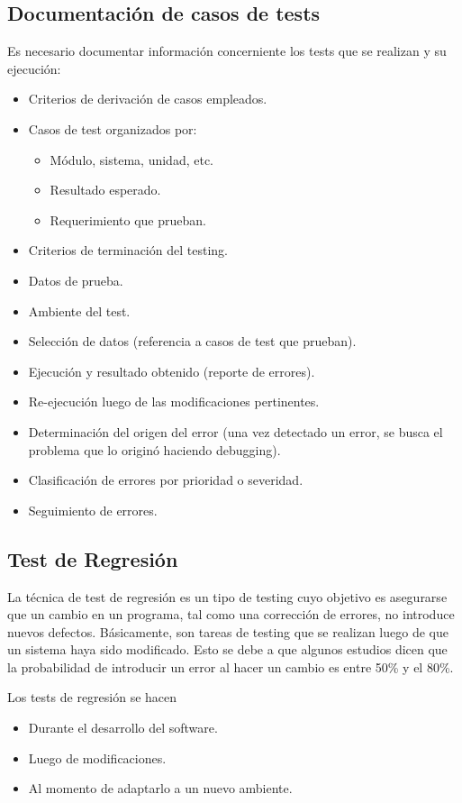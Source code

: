 \documentclass[]{article}
\begin{document}
\subsection{Documentación de casos de tests}
Es necesario documentar información concerniente los tests que se realizan y su ejecución:
\begin{itemize}
	\item Criterios de derivación de casos empleados.
	\item Casos de test organizados por:
	\begin{itemize}
		\item Módulo, sistema, unidad, etc.
		\item Resultado esperado.
		\item Requerimiento que prueban.
	\end{itemize}
	\item Criterios de terminación del testing.
	\item Datos de prueba.
	\item Ambiente del test.
	\item Selección de datos (referencia a casos de test que prueban).
	\item Ejecución y resultado obtenido (reporte de errores).
	\item Re-ejecución luego de las modificaciones pertinentes.
	\item Determinación del origen del error (una vez detectado un error, se busca el problema que lo originó haciendo debugging).
	\item Clasificación de errores por prioridad o severidad.
	\item Seguimiento de errores.
\end{itemize}

\subsection{Test de Regresión}
La técnica de test de regresión es un tipo de testing cuyo objetivo es asegurarse que un cambio en un programa, tal como una corrección de errores, no introduce nuevos defectos. Básicamente, son tareas de testing que se realizan luego de que un sistema haya sido modificado. Esto se debe a que algunos estudios dicen que la probabilidad de introducir un error al hacer un cambio es entre 50\% y el 80\%.

Los tests de regresión se hacen
\begin{itemize}
	\item Durante el desarrollo del software.
	\item Luego de modificaciones.
	\item Al momento de adaptarlo a un nuevo ambiente.
\end{itemize}
\end{document}
